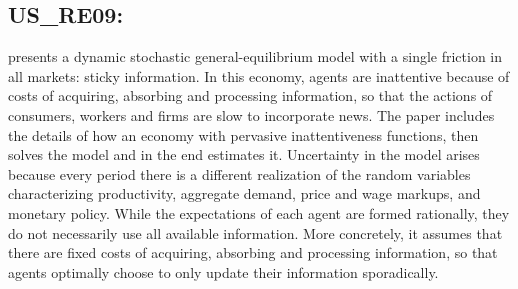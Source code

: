 \documentclass[11pt,a4paper]{article}
\begin{document}
	\subsection{US\_RE09: \cite{reis2009sticky}}
	\label{USRE09}
	\cite{reis2009sticky} presents a dynamic stochastic general-equilibrium model with a single friction in all markets: sticky information. In this economy, agents are inattentive because of costs of acquiring, absorbing and processing information, so that the actions of consumers, workers and firms are slow to incorporate news. The paper includes the details of how an economy with pervasive inattentiveness functions, then solves the model and in the end estimates it. Uncertainty in the model arises because every period there is a different realization of the random variables characterizing productivity, aggregate demand, price and wage markups, and monetary policy. While the expectations of each agent are formed rationally, they do not necessarily use all available information. More concretely, it assumes that there are fixed costs of acquiring, absorbing and processing information, so that agents optimally choose to only update their information sporadically.
\end{document}
